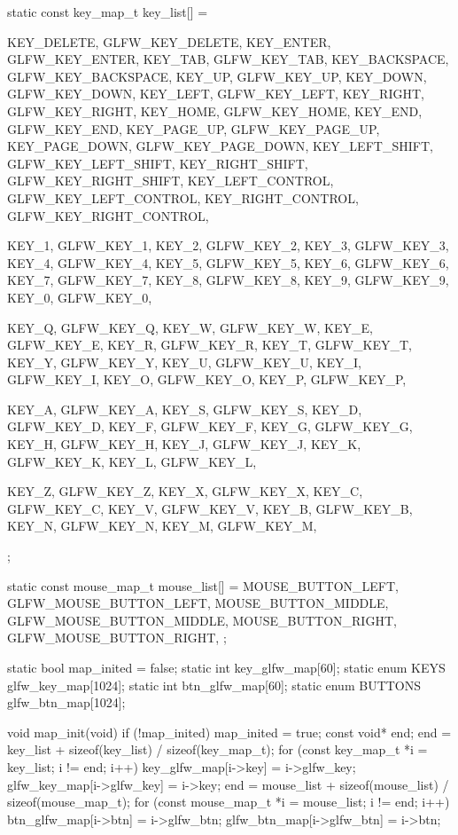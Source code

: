 \begin{multicols}{2}
\begin{ccode}
static const key_map_t key_list[] = {
    {KEY_DELETE,        GLFW_KEY_DELETE},
    {KEY_ENTER,         GLFW_KEY_ENTER},
    {KEY_TAB,           GLFW_KEY_TAB},
    {KEY_BACKSPACE,     GLFW_KEY_BACKSPACE},
    {KEY_UP,            GLFW_KEY_UP},
    {KEY_DOWN,          GLFW_KEY_DOWN},
    {KEY_LEFT,          GLFW_KEY_LEFT},
    {KEY_RIGHT,         GLFW_KEY_RIGHT},
    {KEY_HOME,          GLFW_KEY_HOME},
    {KEY_END,           GLFW_KEY_END},
    {KEY_PAGE_UP,       GLFW_KEY_PAGE_UP},
    {KEY_PAGE_DOWN,     GLFW_KEY_PAGE_DOWN},
    {KEY_LEFT_SHIFT,    GLFW_KEY_LEFT_SHIFT},
    {KEY_RIGHT_SHIFT,   GLFW_KEY_RIGHT_SHIFT},
    {KEY_LEFT_CONTROL,  GLFW_KEY_LEFT_CONTROL},
    {KEY_RIGHT_CONTROL, GLFW_KEY_RIGHT_CONTROL},

    {KEY_1, GLFW_KEY_1}, {KEY_2, GLFW_KEY_2}, {KEY_3, GLFW_KEY_3},
    {KEY_4, GLFW_KEY_4}, {KEY_5, GLFW_KEY_5}, {KEY_6, GLFW_KEY_6},
    {KEY_7, GLFW_KEY_7}, {KEY_8, GLFW_KEY_8}, {KEY_9, GLFW_KEY_9},
    {KEY_0, GLFW_KEY_0},

    {KEY_Q, GLFW_KEY_Q}, {KEY_W, GLFW_KEY_W}, {KEY_E, GLFW_KEY_E},
    {KEY_R, GLFW_KEY_R}, {KEY_T, GLFW_KEY_T}, {KEY_Y, GLFW_KEY_Y},
    {KEY_U, GLFW_KEY_U}, {KEY_I, GLFW_KEY_I}, {KEY_O, GLFW_KEY_O},
    {KEY_P, GLFW_KEY_P},

    {KEY_A, GLFW_KEY_A}, {KEY_S, GLFW_KEY_S}, {KEY_D, GLFW_KEY_D},
    {KEY_F, GLFW_KEY_F}, {KEY_G, GLFW_KEY_G}, {KEY_H, GLFW_KEY_H},
    {KEY_J, GLFW_KEY_J}, {KEY_K, GLFW_KEY_K}, {KEY_L, GLFW_KEY_L},

    {KEY_Z, GLFW_KEY_Z}, {KEY_X, GLFW_KEY_X}, {KEY_C, GLFW_KEY_C},
    {KEY_V, GLFW_KEY_V}, {KEY_B, GLFW_KEY_B}, {KEY_N, GLFW_KEY_N},
    {KEY_M, GLFW_KEY_M},
};

static const mouse_map_t mouse_list[] = {
    {MOUSE_BUTTON_LEFT, GLFW_MOUSE_BUTTON_LEFT},
    {MOUSE_BUTTON_MIDDLE, GLFW_MOUSE_BUTTON_MIDDLE},
    {MOUSE_BUTTON_RIGHT, GLFW_MOUSE_BUTTON_RIGHT},
};

static bool map_inited = false;
static int key_glfw_map[60];
static enum KEYS glfw_key_map[1024];
static int btn_glfw_map[60];
static enum BUTTONS glfw_btn_map[1024];

void map_init(void) {
    if (!map_inited) {
        map_inited = true;
        const void* end;
        end = key_list + sizeof(key_list) / sizeof(key_map_t);
        for (const key_map_t *i = key_list; i != end; i++) {
            key_glfw_map[i->key] = i->glfw_key;
            glfw_key_map[i->glfw_key] = i->key;
        }
        end = mouse_list + sizeof(mouse_list) / sizeof(mouse_map_t);
        for (const mouse_map_t *i = mouse_list; i != end; i++) {
            btn_glfw_map[i->btn] = i->glfw_btn;
            glfw_btn_map[i->glfw_btn] = i->btn;
        }
    }
}


\end{ccode}
\end{multicols}
